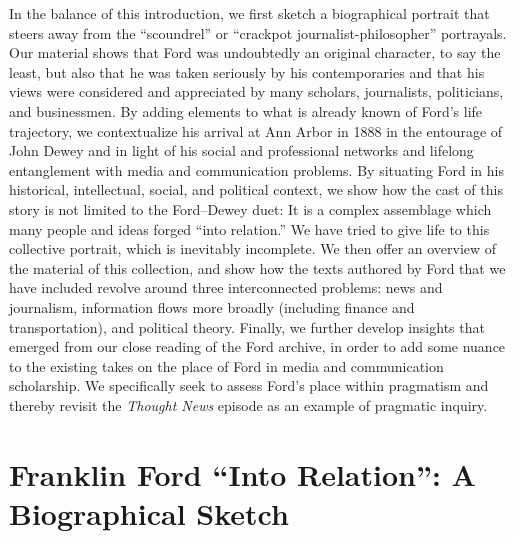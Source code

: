 \documentclass[twoside,symmetric,nobib,justified]{tufte-book}
\begin{document}
In the balance of this introduction, we first sketch a biographical
portrait that steers away from the ``scoundrel'' or ``crackpot
journalist-philosopher'' portrayals. Our material shows that Ford was
undoubtedly an original character, to say the least, but also that he
was taken seriously by his contemporaries and that his views were
considered and appreciated by many scholars, journalists, politicians,
and businessmen. By adding elements to what is already known of Ford's
life trajectory, we contextualize his arrival at Ann Arbor in 1888 in
the entourage of John Dewey and in light of his social and professional
networks and lifelong entanglement with media and communication
problems. By situating Ford in his historical, intellectual, social, and
political context, we show how the cast of this story is not limited to
the Ford--Dewey duet: It is a complex assemblage which many people and
ideas forged ``into relation.'' We have tried to give life to this
collective portrait, which is inevitably incomplete. We then offer an
overview of the material of this collection, and show how the texts
authored by Ford that we have included revolve around three
interconnected problems: news and journalism, information flows more
broadly (including finance and transportation), and political theory.
Finally, we further develop insights that emerged from our close reading
of the Ford archive, in order to add some nuance to the existing takes
on the place of Ford in media and communication scholarship. We
specifically seek to assess Ford's place within pragmatism and thereby
revisit the \emph{Thought News} episode as an example of pragmatic
inquiry.

\hypertarget{franklin-ford-into-relation-a-biographical-sketch}{%
\section{Franklin Ford ``Into Relation'': A\\\noindent Biographical
Sketch}\label{franklin-ford-into-relation-a-biographical-sketch}}
\end{document}
